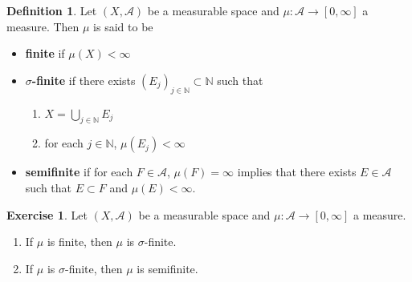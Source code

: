 \documentclass[12pt]{amsart}
\theoremstyle{definition}
\newtheorem{defn}[definition]{Definition}
\newtheorem{ex}[definition]{Exercise}
\newcommand{\sig}{\sigma}
\newcommand{\N}{\mathbb{N}}
\newcommand{\MA}{\mathcal{A}}
\begin{document}
	\begin{defn}
		Let $(X, \MA)$ be a measurable space and $\mu: \MA \rightarrow [0, \infty]$ a measure. Then $\mu$ is said to be 
		\begin{itemize}
			\item \textbf{finite} if $\mu(X) < \infty$
			\item \textbf{$\sig$-finite} if there exists $(E_j)_{j \in \N} \subset \N$ such that 
			\begin{enumerate}
				\item $X = \bigcup\limits_{j \in \N} E_j$
				\item for each $j \in \N$, $\mu(E_j) < \infty$
			\end{enumerate}
			\item \textbf{semifinite} if for each $F \in \MA$, $\mu(F) = \infty$ implies that there exists $E \in \MA$ such that $E \subset F$ and $\mu(E) < \infty$.
		\end{itemize}
	\end{defn}

	\begin{ex}
		Let $(X, \MA)$ be a measurable space and $\mu: \MA \rightarrow [0, \infty]$ a measure. 
		\begin{enumerate}
			\item If $\mu$ is finite, then $\mu$ is $\sig$-finite. 
			\item If $\mu$ is $\sig$-finite, then $\mu$ is semifinite.
		\end{enumerate}
	\end{ex}
\end{document}
